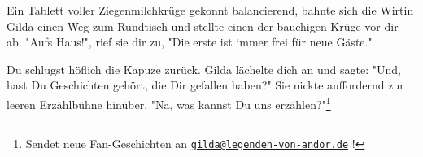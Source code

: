 Ein Tablett voller Ziegenmilchkrüge gekonnt balancierend, bahnte sich die Wirtin Gilda einen Weg zum Rundtisch und stellte einen der bauchigen Krüge vor dir ab. "Aufs Haus!", rief sie dir zu, "Die erste ist immer frei für neue Gäste." 

Du schlugst höflich die Kapuze zurück. Gilda lächelte dich an und sagte: "Und, hast Du Geschichten gehört, die Dir gefallen haben?" Sie nickte auffordernd zur leeren Erzählbühne hinüber. "Na, was kannst Du uns erzählen?"\footnote{Sendet neue Fan-Geschichten an \href{mailto:gilda@legenden-von-andor.de}{\texttt{gilda@legenden-von-andor.de}} !}

